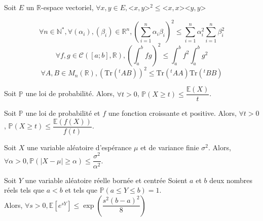 \documentclass[landscape,twocolumn]{article}
\begin{document}
\begin{ine}
\begin{center}
Soit $E$ un $\mathbb{R}$-espace vectoriel, $\forall x,y \in E, $<$x,y$>$^2 \leqslant $<$x,x$>$ $<$y,y$>
\end{center}
\end{ine}

\begin{exe}
$$\forall n \in \mathbb{N}^*,\forall (\alpha_i),(\beta_i) \in \mathbb{R}^n, \left(\sum  \limits_{i=1}^n \alpha_i \beta_i \right)^2 \leqslant \sum \limits_{i=1}^n \alpha_i^2 \sum \limits_{i=1}^n \beta_i^2$$
$$\forall f,g \in \mathcal{C}([a;b],\mathbb{R}),\left( \displaystyle \int_a^b fg \right)^2 \leqslant \displaystyle \int_a^b f^2 \displaystyle \int_a^b g^2$$
$$\forall A,B \in M_n(\mathbb{R}),\left( \mbox{Tr}(^tAB) \right)^2 \leqslant \mbox{Tr}(^tAA)\mbox{Tr}(^tBB)$$
\end{exe}

\begin{ine}
\begin{center}
Soit $\mathbb{P}$ une loi de probabilité. Alors, 
$\forall t > 0$, $\mathbb{P}(X \geq t) \leq \dfrac{\mathbb{E}(X)}{t}$.
\end{center}
\end{ine}

\begin{ine}
\begin{center}
Soit $\mathbb{P}$ une loi de probabilité et $f$ une fonction croissante et positive. Alors, 
$\forall t > 0$, $\mathbb{P}(X \geq t) \leq \dfrac{\mathbb{E}(f(X))}{f(t)}$.
\end{center}
\end{ine}

\begin{ine}
\begin{center}
Soit $X$ une variable aléatoire d'espérance $\mu$ et de variance finie $\sigma^2$. Alors, 
$\forall \alpha >0, \mathbb{P}(|X-\mu| \geq \alpha) \leq \dfrac{\sigma^2}{\alpha^2}$.
\end{center}
\end{ine}

\begin{ine}
\begin{center}
Soit $Y$ une variable aléatoire réelle bornée et centrée Soient $a$ et $b$ deux nombres réels tels que $a<b$ et tels que $\mathbb{P}(a \leq Y \leq b) = 1$. \\
Alors, $\forall s >0, \mathbb{E} \left[e^{sY} \right] \leq \exp \left( \dfrac{s^2(b-a)^2}{8}\right)$
\end{center}
\end{ine}
\end{document}
